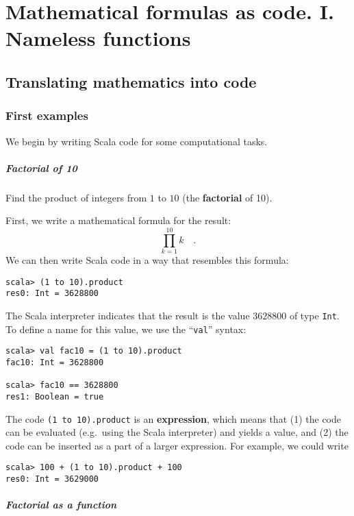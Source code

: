 
\chapter{Mathematical formulas as code. I. Nameless functions\label{chap:1-Values,-types,-expressions,}}

\section{Translating mathematics into code}

\subsection{First examples}

We begin by writing Scala code for some computational tasks.

\paragraph{Factorial of 10}

Find the product of integers from $1$ to $10$ (the \textbf{factorial}
of 10).

First, we write a mathematical formula for the result:
\[
\prod_{k=1}^{10}k\quad.
\]
We can then write Scala code in a way that resembles this formula:
\begin{lstlisting}
scala> (1 to 10).product
res0: Int = 3628800
\end{lstlisting}

The Scala interpreter indicates that the result is the value $3628800$
of type \lstinline!Int!. To define a name for this value, we use
the ``\lstinline!val!'' syntax:
\begin{lstlisting}
scala> val fac10 = (1 to 10).product
fac10: Int = 3628800

scala> fac10 == 3628800
res1: Boolean = true
\end{lstlisting}

The code \texttt{}\lstinline!(1 to 10).product! is an \textbf{expression},
which means that (1) the code can be evaluated (e.g.~using the Scala
interpreter) and yields a value, and (2) the code can be inserted
as a part of a larger expression. For example, we could write
\begin{lstlisting}
scala> 100 + (1 to 10).product + 100
res0: Int = 3629000
\end{lstlisting}


\paragraph{Factorial as a function}

